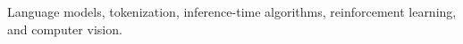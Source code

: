 
\begin{cvparagraph}
Language models, tokenization, inference-time algorithms, reinforcement learning, and computer vision.
\end{cvparagraph}
